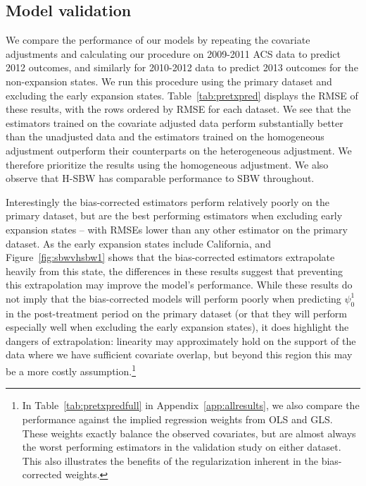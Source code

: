 \documentclass[aoas]{imsart}
\theoremstyle{plain}
\theoremstyle{remark}
\begin{document}
\subsection{Model validation}\label{sec:validation}

We compare the performance of our models by repeating the covariate adjustments and calculating our procedure on 2009-2011 ACS data to predict 2012 outcomes, and similarly for 2010-2012 data to predict 2013 outcomes for the non-expansion states. We run this procedure using the primary dataset and excluding the early expansion states. Table~\ref{tab:pretxpred} displays the RMSE of these results, with the rows ordered by RMSE for each dataset. We see that the estimators trained on the covariate adjusted data perform substantially better than the unadjusted data and the estimators trained on the homogeneous adjustment outperform their counterparts on the heterogeneous adjustment. We therefore prioritize the results using the homogeneous adjustment. We also observe that H-SBW has comparable performance to SBW throughout.

Interestingly the bias-corrected estimators perform relatively poorly on the primary dataset, but are the best performing estimators when excluding early expansion states -- with RMSEs lower than any other estimator on the primary dataset. As the early expansion states include California, and Figure~\ref{fig:sbwvhsbw1} shows that the bias-corrected estimators extrapolate heavily from this state, the differences in these results suggest that preventing this extrapolation may improve the model's performance. While these results do not imply that the bias-corrected models will perform poorly when predicting $\psi^1_0$ in the post-treatment period on the primary dataset (or that they will perform especially well when excluding the early expansion states), it does highlight the dangers of extrapolation: linearity may approximately hold on the support of the data where we have sufficient covariate overlap, but beyond this region this may be a more costly assumption.\footnote{In Table~\ref{tab:pretxpredfull} in Appendix~\ref{app:allresults}, we also compare the performance against the implied regression weights from OLS and GLS. These weights exactly balance the observed covariates, but are almost always the worst performing estimators in the validation study on either dataset. This also illustrates the benefits of the regularization inherent in the bias-corrected weights.}
\end{document}
